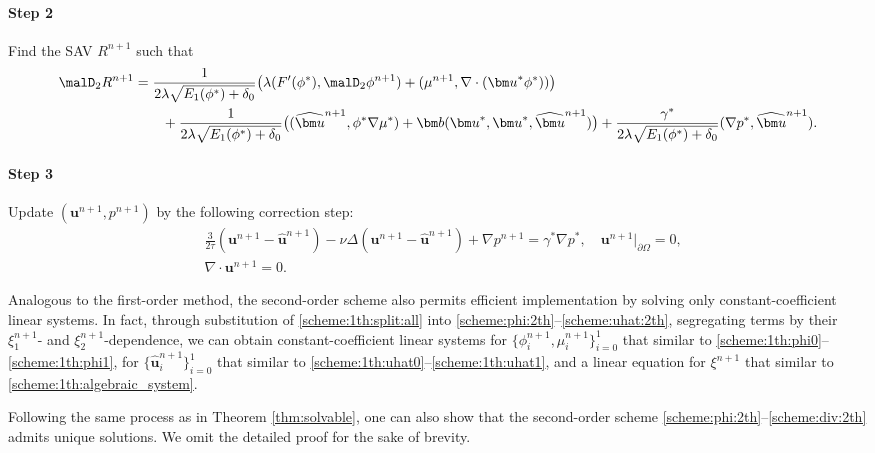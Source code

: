 \paragraph{\bf Step 2}  Find the SAV $R^{n+1}$ such that 
\begin{equation}\label{scheme:rhat:2th}
	\begin{aligned}
		\malD_2 R^{n+1}
		&=\frac{1}{2\lambda \sqrt{E_1(\phi^*)+\delta_0}} \big( \lambda (F^{\prime}(\phi^*), \malD_2 \phi^{n+1} ) + (\mu^{n+1},  \nabla \cdot({\bm u}^* \phi^*)) \big) \\
		&\qquad +\frac{1}{2\lambda \sqrt{E_1(\phi^*)+\delta_0}} \big( ( \widehat{\bm u}^{n+1}, \phi^* \nabla \mu^*)
		+ \bm b({\bm u}^*, {\bm u}^*,  \widehat{\bm u}^{n+1}) \big) 
		  +\frac{\gamma^*}{2\lambda \sqrt{E_1(\phi^*)+\delta_0}}   (\nabla p^*,  \widehat {\bm u}^{n+1}).
	\end{aligned}
\end{equation}

\paragraph{\bf Step 3}  Update $ (\bm u^{n+1}, p^{n+1})$ by the following correction step:
\begin{align}
	&  \frac{3}{2\tau}({\bm u}^{n+1}- \widehat {\bm u}^{n+1}) -\nu \Delta ( \bm u^{n+1}- \widehat {\bm u}^{n+1})+\nabla p^{n+1} = \gamma^*  \nabla p^{*}, \quad  {\bm u}^{n+1}|_{\partial \Omega}=0, \label{scheme:uplus1:2th}   \\
	& \nabla \cdot  \bm u^{n+1} = 0. \label{scheme:div:2th}
\end{align}

\begin{remark} Analogous to the first-order method, the second-order scheme also permits efficient implementation by solving only constant-coefficient linear systems. In fact, through substitution of \eqref{scheme:1th:split:all} into \eqref{scheme:phi:2th}–\eqref{scheme:uhat:2th}, segregating terms by their $\xi_1^{n+1}$- and $\xi_2^{n+1}$-dependence,  we can obtain constant-coefficient linear systems
	for $\{\phi_i^{n+1}, \mu_i^{n+1}\}_{i=0}^1$ that similar to \eqref{scheme:1th:phi0}--\eqref{scheme:1th:phi1}, for $\{\widehat{\bm u}_i^{n+1}\}_{i=0}^1$ that similar to \eqref{scheme:1th:uhat0}--\eqref{scheme:1th:uhat1}, and a linear equation for
	$\xi^{n+1}$ that similar to \eqref{scheme:1th:algebraic_system}.
\end{remark}
\begin{remark}  Following the same process as in Theorem \ref{thm:solvable}, one can also show that the second-order scheme \eqref{scheme:phi:2th}--\eqref{scheme:div:2th}  admits unique solutions. We omit the detailed proof for the sake of brevity.
\end{remark}

